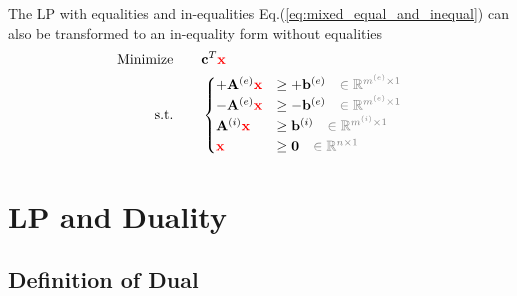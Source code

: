 \documentclass[twocolumn]{ctexart}
\begin{document}
The LP with equalities and in-equalities Eq.(\ref{eq:mixed_equal_and_inequal})
can also be transformed to an in-equality form without equalities
\begin{equation}
    \begin{aligned}
        \label{eq:only_inequal}
        \text{Minimize} \qquad &
            \mathbf{c}^T  \mathbf{\color{red} x}
        \\
        \text{s.t.} \qquad &
            \begin{cases}
                +\mathbf{A}^{(e)}  \mathbf{\color{red} x}  &  \geq  +\mathbf{b}^{(e)}  {\color{gray} \quad \in \mathbb{R}^{m^{(e)} \times 1}}  \\
                -\mathbf{A}^{(e)}  \mathbf{\color{red} x}  &  \geq  -\mathbf{b}^{(e)}  {\color{gray} \quad \in \mathbb{R}^{m^{(e)} \times 1}}  \\
                 \mathbf{A}^{(i)}  \mathbf{\color{red} x}  &  \geq   \mathbf{b}^{(i)}  {\color{gray} \quad \in \mathbb{R}^{m^{(i)} \times 1}}  \\
                                   \mathbf{\color{red} x}  &  \geq   \mathbf{0}        {\color{gray} \quad \in \mathbb{R}^{n       \times 1}}  \\
            \end{cases}
    \end{aligned}
\end{equation}










\clearpage
\vspace{30pt}
\section{LP and Duality}

\subsection{Definition of Dual}
\label{sec:def_of_dual}
\end{document}
